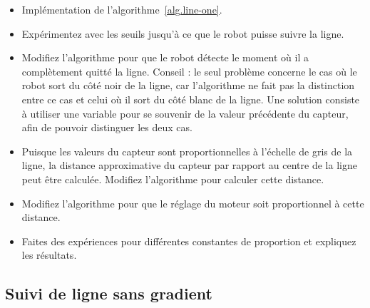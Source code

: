 {\begin{framed}
\begin{itemize}
\item Implémentation de l'algorithme~\ref{alg.line-one}.
\item Expérimentez avec les seuils jusqu'à ce que le robot puisse suivre la ligne.
\item Modifiez l'algorithme pour que le robot détecte le moment où il a complètement quitté la ligne. Conseil : le seul problème concerne le cas où le robot sort du côté noir de la ligne, car l'algorithme ne fait pas la distinction entre ce cas et celui où il sort du côté blanc de la ligne. Une solution consiste à utiliser une variable pour se souvenir de la valeur précédente du capteur, afin de pouvoir distinguer les deux cas.
\end{itemize}
\end{framed}

\begin{framed}
\begin{itemize}
\item Puisque les valeurs du capteur sont proportionnelles à l'échelle de gris de la ligne, la distance approximative du capteur par rapport au centre de la ligne peut être calculée. Modifiez l'algorithme pour calculer cette distance.
\item Modifiez l'algorithme pour que le réglage du moteur soit proportionnel à cette distance.
\item Faites des expériences pour différentes constantes de proportion et expliquez les résultats.
\end{itemize}
\end{framed}

\subsection{Suivi de ligne sans gradient}\label{s.no-gradient}

}

